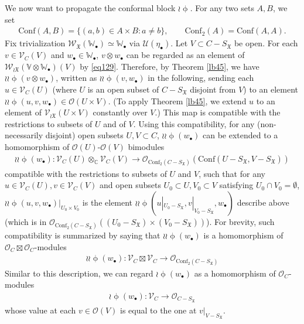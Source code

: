 \documentclass[12pt,a4paper,notitlepage]{report}
\theoremstyle{definition}
\theoremstyle{plain}
\newcommand{\fk}{\mathfrak}
\newcommand{\mc}{\mathcal}
\newcommand{\Conf}{\mathrm{Conf}}
\newcommand{\scr}{\mathscr}
\newcommand{\blt}{\bullet}
\newcommand{\Vbb}{\mathbb V}
\newcommand{\Wbb}{\mathbb W}
\newcommand{\Cbb}{\mathbb C}
\numberwithin{equation}{section}
\begin{document}
We now want to propagate the conformal block $\wr\upphi$. For any two sets $A,B$, we set \index{Conf@$\Conf$}
\begin{gather}
\Conf(A,B)=\{(a,b)\in A\times B:a\neq b\},\qquad \Conf_2(A)=\Conf(A,A).\label{eq135}
\end{gather}
Fix trivialization $\scr W_{\fk X}(\Wbb_\blt)\simeq\Wbb_\blt$ via $\mc U(\eta_\blt)$. Let $V\subset C-S_{\fk X}$ be open. For each $v\in\scr V_C(V)$ and $w_\blt\in\Wbb_\blt$, $v\otimes w_\blt$ can be regarded as an element of $\scr W_{\wr\fk X}(\Vbb\otimes\Wbb_\blt)(V)$ by \eqref{eq129}. Therefore, by Theorem \ref{lb45}, we have $\wr\wr\upphi(v\otimes w_\blt)$, written as $\wr\wr\upphi(v,w_\blt)$ in the following,  sending each $u\in\scr V_C(U)$ (where $U$ is an open subset of $C-S_{\fk X}$ disjoint from $V$) to an element $\wr\wr\upphi(u,v,w_\blt)\in\scr O(U\times V)$. (To apply Theorem \ref{lb45}, we extend $u$ to an element of $\scr V_{\wr\fk X}(U\times V)$ constantly over $V$.) This map is compatible with the restrictions to subsets of $U$ and of $V$. Using this compatibility, for any (non-necessarily disjoint) open subsets $U,V\subset C$, $\wr\wr\upphi(w_\blt)$ can be extended to a homomorphism of $\scr O(U)$-$\scr O(V)$ bimodules
\begin{align}
\wr\wr\upphi(w_\blt):\scr V_C(U)\otimes_\Cbb \scr V_C(V)\rightarrow\scr O_{\Conf_2(C-S_{\fk X})}(\Conf(U-S_{\fk X},V-S_{\fk X}))
\end{align}
compatible with the restrictions to subsets of $U$ and $V$, such that for any $u\in\scr V_C(U),v\in\scr V_C(V)$ and open subsets $U_0\subset U,V_0\subset V$ satisfying $U_0\cap V_0=\emptyset$, $\wr\wr\upphi(u,v,w_\blt)|_{U_0\times V_0}$ is the element $\wr\wr\upphi(u|_{U_0-S_{\fk X}},v|_{V_0-S_{\fk X}},w_\blt)$ describe above (which is in $\scr O_{\Conf_2(C-S_{\fk X})}((U_0-S_{\fk X})\times (V_0-S_{\fk X}))$). For brevity, such compatibility is summarized by saying that $\wr\wr\upphi(w_\blt)$ is a homomorphism of $\scr O_C\boxtimes\scr O_C$-modules
\begin{align}
\boxed{~~\wr\wr\upphi(w_\blt):\scr V_C\boxtimes\scr V_C\rightarrow\scr O_{\Conf_2(C-S_{\fk X})}~~}
\end{align}
Similar to this description, we can regard $\wr\upphi(w_\blt)$ as a homomorphism of $\scr O_C$-modules
\begin{align}
\boxed{~~\wr\upphi(w_\blt):\scr V_C\rightarrow\scr O_{C-S_{\fk X}}~~}
\end{align}
whose value at each $v\in\scr O(V)$ is equal to the one at $v|_{V-S_{\fk X}}$. 
\end{document}
